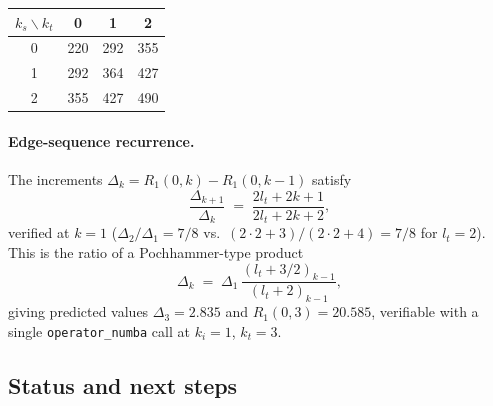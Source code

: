 \documentclass{article}
\begin{document}
\begin{center}
\begin{tabular}{c|ccc}
  $k_s \backslash k_t$ & 0 & 1 & 2 \\
  \hline
  0 & 220 & 292 & 355 \\
  1 & 292 & 364 & 427 \\
  2 & 355 & 427 & 490 \\
\end{tabular}
\end{center}

\paragraph{Edge-sequence recurrence.}
The increments $\Delta_k = R_1(0,k) - R_1(0,k-1)$ satisfy
\[
  \frac{\Delta_{k+1}}{\Delta_k} \;=\; \frac{2l_t+2k+1}{2l_t+2k+2},
\]
verified at $k=1$ ($\Delta_2/\Delta_1 = 7/8$ vs.\ $(2\cdot2+3)/(2\cdot2+4) = 7/8$
for $l_t=2$).  This is the ratio of a Pochhammer-type product
\[
  \Delta_k \;=\; \Delta_1\,\frac{(l_t+3/2)_{k-1}}{(l_t+2)_{k-1}},
\]
giving predicted values $\Delta_3 = 2.835$ and $R_1(0,3) = 20.585$,
verifiable with a single \texttt{operator\_numba} call at $k_i=1$, $k_t=3$.

\subsection*{Status and next steps}
\end{document}
